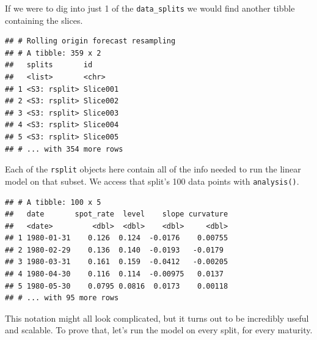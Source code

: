 \documentclass[]{book}
\newenvironment{Shaded}{\begin{snugshade}}{\end{snugshade}}
\newcommand{\DecValTok}[1]{\textcolor[rgb]{0.00,0.00,0.81}{#1}}
\newcommand{\KeywordTok}[1]{\textcolor[rgb]{0.13,0.29,0.53}{\textbf{#1}}}
\newcommand{\NormalTok}[1]{#1}
\newcommand{\OperatorTok}[1]{\textcolor[rgb]{0.81,0.36,0.00}{\textbf{#1}}}
\theoremstyle{definition}
\theoremstyle{definition}
\theoremstyle{definition}
\theoremstyle{remark}
\begin{document}
If we were to dig into just 1 of the \texttt{data\_splits} we would find
another tibble containing the slices.

\begin{Shaded}
\end{Shaded}

\begin{verbatim}
## # Rolling origin forecast resampling 
## # A tibble: 359 x 2
##   splits       id      
##   <list>       <chr>   
## 1 <S3: rsplit> Slice001
## 2 <S3: rsplit> Slice002
## 3 <S3: rsplit> Slice003
## 4 <S3: rsplit> Slice004
## 5 <S3: rsplit> Slice005
## # ... with 354 more rows
\end{verbatim}

Each of the \texttt{rsplit} objects here contain all of the info needed
to run the linear model on that subset. We access that split's 100 data
points with \texttt{analysis()}.

\begin{Shaded}
\end{Shaded}

\begin{verbatim}
## # A tibble: 100 x 5
##   date       spot_rate  level    slope curvature
##   <date>         <dbl>  <dbl>    <dbl>     <dbl>
## 1 1980-01-31    0.126  0.124  -0.0176    0.00755
## 2 1980-02-29    0.136  0.140  -0.0193   -0.0179 
## 3 1980-03-31    0.161  0.159  -0.0412   -0.00205
## 4 1980-04-30    0.116  0.114  -0.00975   0.0137 
## 5 1980-05-30    0.0795 0.0816  0.0173    0.00118
## # ... with 95 more rows
\end{verbatim}

This notation might all look complicated, but it turns out to be
incredibly useful and scalable. To prove that, let's run the model on
every split, for every maturity.
\end{document}
